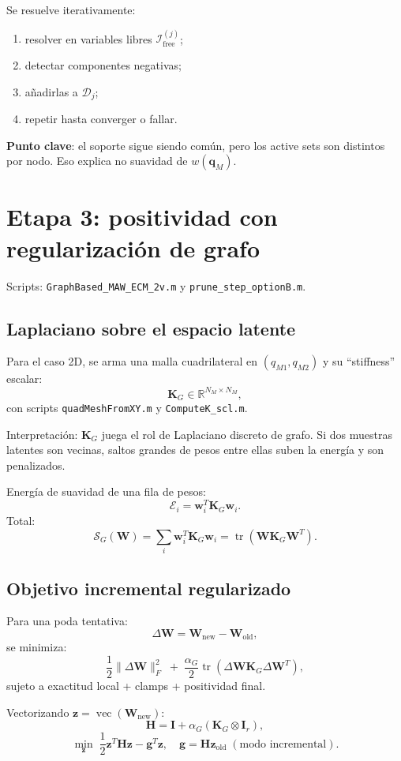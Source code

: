 \documentclass[11pt,a4paper]{article}
\newcommand{\W}{\bm W}
\newcommand{\K}{\bm K}
\begin{document}
Se resuelve iterativamente:
\begin{enumerate}[leftmargin=1.2cm]
    \item resolver en variables libres $\mathcal I^{(j)}_{\text{free}}$;
    \item detectar componentes negativas;
    \item a\~nadirlas a $\mathcal D_j$;
    \item repetir hasta converger o fallar.
\end{enumerate}

\textbf{Punto clave}: el soporte sigue siendo com\'un, pero los active sets son
distintos por nodo. Eso explica no suavidad de $w(\bm q_M)$.

\section{Etapa 3: positividad con regularizaci\'on de grafo}
Scripts: \texttt{GraphBased\_MAW\_ECM\_2v.m} y
\texttt{prune\_step\_optionB.m}.

\subsection{Laplaciano sobre el espacio latente}
Para el caso 2D, se arma una malla cuadrilateral en $(q_{M1},q_{M2})$ y su
``stiffness'' escalar:
\[
\K_G \in \mathbb R^{N_M\times N_M},
\]
con scripts \texttt{quadMeshFromXY.m} y \texttt{ComputeK\_scl.m}.

Interpretaci\'on: $\K_G$ juega el rol de Laplaciano discreto de grafo.
Si dos muestras latentes son vecinas, saltos grandes de pesos entre ellas
suben la energ\'ia y son penalizados.

Energ\'ia de suavidad de una fila de pesos:
\[
\mathcal E_i = \bm w_i^T\K_G\bm w_i.
\]
Total:
\[
\mathcal S_G(\W)=\sum_i \bm w_i^T\K_G\bm w_i
=\operatorname{tr}(\W\K_G\W^T).
\]

\subsection{Objetivo incremental regularizado}
Para una poda tentativa:
\[
\Delta\W=\W_{\text{new}}-\W_{\text{old}},
\]
se minimiza:
\[
\frac{1}{2}\|\Delta\W\|_F^2
\;+\;
\frac{\alpha_G}{2}\operatorname{tr}(\Delta\W \K_G \Delta\W^T),
\]
sujeto a exactitud local + clamps + positividad final.

Vectorizando $\bm z=\operatorname{vec}(\W_{\text{new}})$:
\[
\bm H=
\bm I+\alpha_G(\K_G\otimes \bm I_r),
\]
\[
\min_{\bm z}\;\frac12 \bm z^T\bm H\bm z-\bm g^T\bm z,
\quad \bm g=\bm H\bm z_{\text{old}}
\;(\text{modo incremental}).
\]
\end{document}
